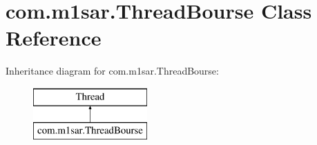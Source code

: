 \hypertarget{classcom_1_1m1sar_1_1_thread_bourse}{}\section{com.\+m1sar.\+Thread\+Bourse Class Reference}
\label{classcom_1_1m1sar_1_1_thread_bourse}
Inheritance diagram for com.\+m1sar.\+Thread\+Bourse\+:\begin{figure}[H]
\begin{center}
\leavevmode
\includegraphics[height=2.000000cm]{classcom_1_1m1sar_1_1_thread_bourse}
\end{center}
\end{figure}
